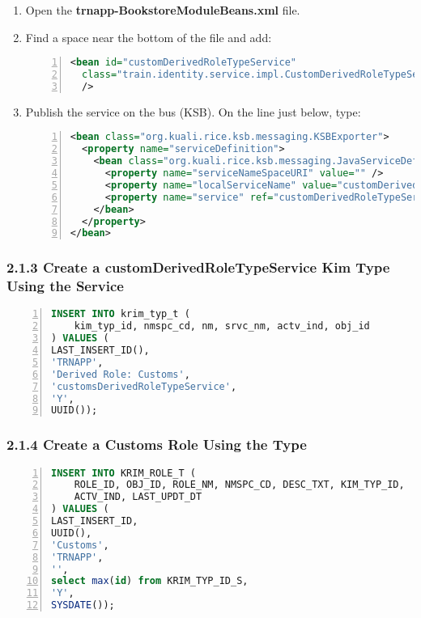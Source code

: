 \begin{enumerate}
  \item Open the \textbf{trnapp-BookstoreModuleBeans.xml} file.
  \item Find a space near the bottom of the file and add:

\begin{lstlisting}[numbers=left,language=xml,basicstyle=\scriptsize,backgroundcolor=\color{ubergray},caption={trnapp-BookstoreModuleBeans.xml},frame=single,breaklines=true]
<bean id="customDerivedRoleTypeService"
  class="train.identity.service.impl.CustomDerivedRoleTypeServiceImpl"
  />
\end{lstlisting}
\item Publish the service on the bus (KSB). On the line just below, type:
\begin{lstlisting}[numbers=left,language=xml,basicstyle=\scriptsize,backgroundcolor=\color{ubergray},caption={trnapp-BookstoreModuleBeans.xml},frame=single,breaklines=true]
<bean class="org.kuali.rice.ksb.messaging.KSBExporter">
  <property name="serviceDefinition">
    <bean class="org.kuali.rice.ksb.messaging.JavaServiceDefinition">
      <property name="serviceNameSpaceURI" value="" />
      <property name="localServiceName" value="customDerivedRoleTypeService" />
      <property name="service" ref="customDerivedRoleTypeService" />
    </bean>
  </property>
</bean>
\end{lstlisting}
\end{enumerate}

\subsubsection*{2.1.3 Create a customDerivedRoleTypeService Kim Type Using the Service}
\begin{lstlisting}[numbers=left,language=sql,basicstyle=\scriptsize,backgroundcolor=\color{ubergray},caption={New
  KIM Type},frame=single,breaklines=true]
INSERT INTO krim_typ_t (
	kim_typ_id, nmspc_cd, nm, srvc_nm, actv_ind, obj_id
) VALUES (
LAST_INSERT_ID(),
'TRNAPP',
'Derived Role: Customs',
'customsDerivedRoleTypeService',
'Y',
UUID());
\end{lstlisting}

\subsubsection*{2.1.4 Create a Customs Role Using the Type}
\begin{lstlisting}[numbers=left,language=sql,basicstyle=\scriptsize,backgroundcolor=\color{ubergray},caption={New
  KIM Type},frame=single,breaklines=true]
INSERT INTO KRIM_ROLE_T (
    ROLE_ID, OBJ_ID, ROLE_NM, NMSPC_CD, DESC_TXT, KIM_TYP_ID,
    ACTV_IND, LAST_UPDT_DT
) VALUES (
LAST_INSERT_ID, 
UUID(), 
'Customs', 
'TRNAPP', 
'', 
select max(id) from KRIM_TYP_ID_S, 
'Y', 
SYSDATE());
\end{lstlisting}

